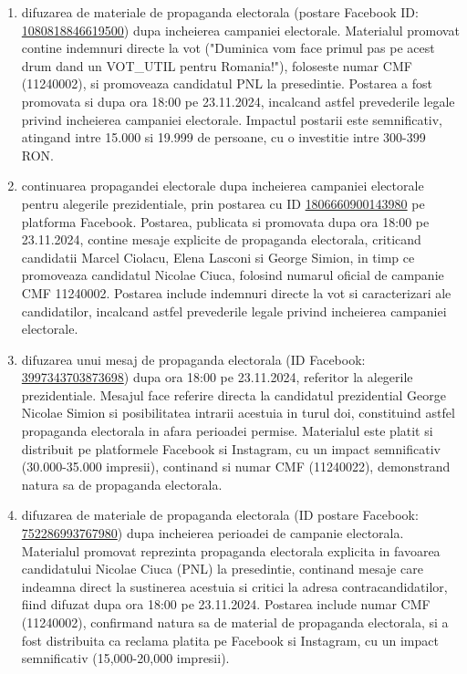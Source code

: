\documentclass[a4paper,12pt]{article}
\begin{document}
\begin{enumerate}[leftmargin=*, label=\arabic*.)]
    \item difuzarea de materiale de propaganda electorala (postare Facebook ID: \href{https://www.facebook.com/ads/library/?id=1080818846619500}{1080818846619500}) dupa incheierea campaniei electorale. Materialul promovat contine indemnuri directe la vot ("Duminica vom face primul pas pe acest drum dand un VOT\_UTIL pentru Romania!"), foloseste numar CMF (11240002), si promoveaza candidatul PNL la presedintie. Postarea a fost promovata si dupa ora 18:00 pe 23.11.2024, incalcand astfel prevederile legale privind incheierea campaniei electorale. Impactul postarii este semnificativ, atingand intre 15.000 si 19.999 de persoane, cu o investitie intre 300-399 RON.
    \item continuarea propagandei electorale dupa incheierea campaniei electorale pentru alegerile prezidentiale, prin postarea cu ID \href{https://www.facebook.com/ads/library/?id=1806660900143980}{1806660900143980} pe platforma Facebook. Postarea, publicata si promovata dupa ora 18:00 pe 23.11.2024, contine mesaje explicite de propaganda electorala, criticand candidatii Marcel Ciolacu, Elena Lasconi si George Simion, in timp ce promoveaza candidatul Nicolae Ciuca, folosind numarul oficial de campanie CMF 11240002. Postarea include indemnuri directe la vot si caracterizari ale candidatilor, incalcand astfel prevederile legale privind incheierea campaniei electorale.
    \item difuzarea unui mesaj de propaganda electorala (ID Facebook: \href{https://www.facebook.com/ads/library/?id=3997343703873698}{3997343703873698}) dupa ora 18:00 pe 23.11.2024, referitor la alegerile prezidentiale. Mesajul face referire directa la candidatul prezidential George Nicolae Simion si posibilitatea intrarii acestuia in turul doi, constituind astfel propaganda electorala in afara perioadei permise. Materialul este platit si distribuit pe platformele Facebook si Instagram, cu un impact semnificativ (30.000-35.000 impresii), continand si numar CMF (11240022), demonstrand natura sa de propaganda electorala.
    \item difuzarea de materiale de propaganda electorala (ID postare Facebook: \href{https://www.facebook.com/ads/library/?id=752286993767980}{752286993767980}) dupa incheierea perioadei de campanie electorala. Materialul promovat reprezinta propaganda electorala explicita in favoarea candidatului Nicolae Ciuca (PNL) la presedintie, continand mesaje care indeamna direct la sustinerea acestuia si critici la adresa contracandidatilor, fiind difuzat dupa ora 18:00 pe 23.11.2024. Postarea include numar CMF (11240002), confirmand natura sa de material de propaganda electorala, si a fost distribuita ca reclama platita pe Facebook si Instagram, cu un impact semnificativ (15,000-20,000 impresii).
\end{enumerate}
\end{document}
